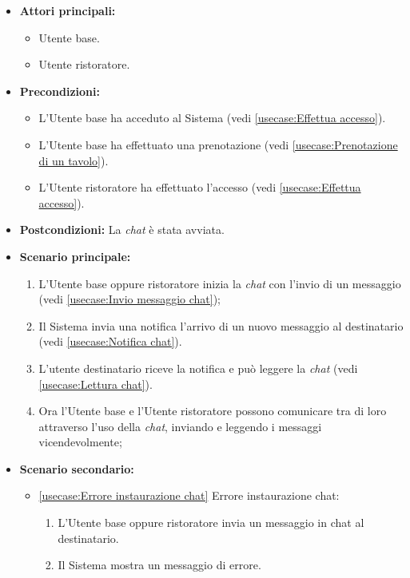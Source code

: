 \label{usecase:Chat Utente base}
\begin{itemize}
	\item \textbf{Attori principali:} 
	\begin{itemize}
        \item Utente base.
        \item Utente ristoratore.
    \end{itemize}

	\item \textbf{Precondizioni:}
	\begin{itemize}
        \item L'Utente base ha acceduto al Sistema (vedi \autoref{usecase:Effettua accesso}).
        \item L'Utente base ha effettuato una prenotazione (vedi \autoref{usecase:Prenotazione di un tavolo}).
        \item L'Utente ristoratore ha effettuato l'accesso (vedi \autoref{usecase:Effettua accesso}).
    \end{itemize}

	\item \textbf{Postcondizioni:} La \textit{chat} è stata avviata.

	\item \textbf{Scenario principale:}
            \begin{enumerate}
                \item L'Utente base oppure ristoratore inizia la \textit{chat} con l'invio di un messaggio (vedi \autoref{usecase:Invio messaggio chat});
                \item Il Sistema invia una notifica l'arrivo di un nuovo messaggio al destinatario (vedi \autoref{usecase:Notifica chat}).
                \item L'utente destinatario riceve la notifica e può leggere la \textit{chat} (vedi \autoref{usecase:Lettura chat}).
                \item Ora l'Utente base e l'Utente ristoratore possono comunicare tra di loro attraverso l'uso della \textit{chat}, inviando e leggendo i messaggi vicendevolmente;
	      \end{enumerate}

    \item \textbf{Scenario secondario:}
		  \begin{itemize}
			  \item \autoref{usecase:Errore instaurazione chat} Errore instaurazione chat:
				\begin{enumerate}
					\item L'Utente base oppure ristoratore invia un messaggio in chat al destinatario.
					\item Il Sistema mostra un messaggio di errore.
				\end{enumerate}
		  \end{itemize}
\end{itemize}